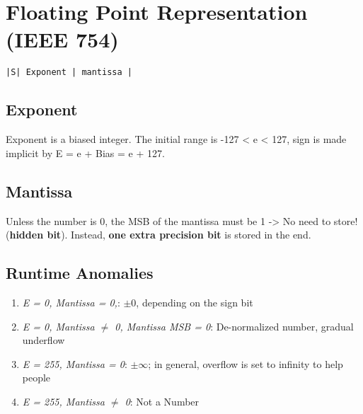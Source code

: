 \documentclass[11pt]{article}
\begin{document}
\section{Floating Point Representation (IEEE 754)}
\label{sec:orgd573ec0}

\texttt{|S| Exponent | mantissa |}

\subsection{Exponent}
\label{sec:orgccf78ee}

Exponent is a biased integer. The initial range is -127 < e < 127, sign is made implicit by E = e + Bias = e + 127.

\subsection{Mantissa}
\label{sec:org714f1df}

Unless the number is 0, the MSB of the mantissa must be 1 -> No need to store! (\textbf{hidden bit}).
Instead, \textbf{one extra precision bit} is stored in the end.

\subsection{Runtime Anomalies}
\label{sec:orgcd37fc0}

\begin{enumerate}
\item \emph{E = 0, Mantissa = 0,}: \(\pm 0\), depending on the sign bit
\item \emph{E = 0, Mantissa \(\neq\) 0, Mantissa MSB = 0}: De-normalized number, gradual underflow
\item \emph{E = 255, Mantissa = 0}: \(\pm \infty\); in general, overflow is set to infinity to help people
\item \emph{E = 255, Mantissa \(\neq\) 0}: Not a Number
\end{enumerate}
\end{document}

